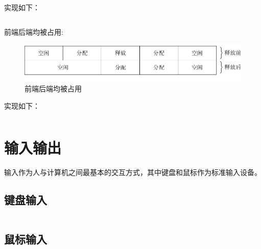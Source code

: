 \documentclass{swfcthesis}
\begin{document}
		实现如下：

		\begin{listing}[H]
		\inputminted[tabsize=2, firstline=118, lastline=127,
		linenos=true]{c}{../ZOS/src/kernel/memory.c}
		\end{listing}

		前端后端均被占用:

		\begin{figure}[h]
			\centering
			\includegraphics[width=.7\textwidth]{fig/mem3.pdf}
			\caption{前端后端均被占用}
			\label{fig:mem4}
		\end{figure}

		实现如下：

		\begin{listing}[H]
		\inputminted[tabsize=2, firstline=128, lastline=141,
		linenos=true]{c}{../ZOS/src/kernel/memory.c}
		\end{listing}

    \section{输入输出}
	
		输入作为人与计算机之间最基本的交互方式，其中键盘和鼠标作为标准输入设备。

		\subsection{键盘输入}
		
		\begin{listing}[H]
		\inputminted[tabsize=2, firstline=162, lastline=170,
		linenos=true]{c}{../ZOS/src/kernel/bootpack.c}
		\end{listing}
		
		\subsection{鼠标输入}

		\begin{listing}[H]
		\inputminted[tabsize=2, firstline=247, lastline=265,
		linenos=true]{c}{../ZOS/src/kernel/bootpack.c}
		\inputminted[tabsize=2, firstline=329, lastline=338,
		linenos=true]{c}{../ZOS/src/kernel/bootpack.c}
		\end{listing}
\end{document}
